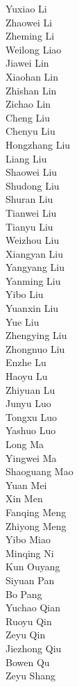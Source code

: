 Yuxiao Li\\
Zhaowei Li\\
Zheming Li\\
Weilong Liao\\
Jiawei Lin\\
Xiaohan Lin\\
Zhishan Lin\\
Zichao Lin\\
Cheng Liu\\
Chenyu Liu\\
Hongzhang Liu\\
Liang Liu\\
Shaowei Liu\\
Shudong Liu\\
Shuran Liu\\
Tianwei Liu\\
Tianyu Liu\\
Weizhou Liu\\
Xiangyan Liu\\
Yangyang Liu\\
Yanming Liu\\
Yibo Liu\\
Yuanxin Liu\\
Yue Liu\\
Zhengying Liu\\
Zhongnuo Liu\\
Enzhe Lu\\
Haoyu Lu\\
Zhiyuan Lu\\
Junyu Luo\\
Tongxu Luo\\
Yashuo Luo\\
Long Ma\\
Yingwei Ma\\
Shaoguang Mao\\
Yuan Mei\\
Xin Men\\
Fanqing Meng\\
Zhiyong Meng\\
Yibo Miao\\
Minqing Ni\\
Kun Ouyang\\
Siyuan Pan\\
Bo Pang\\
Yuchao Qian\\
Ruoyu Qin\\
Zeyu Qin\\
Jiezhong Qiu\\
Bowen Qu\\
Zeyu Shang\\
